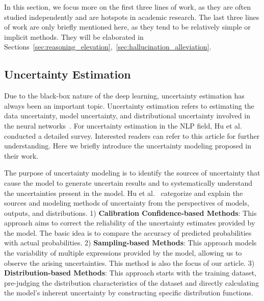 \documentclass[lettersize,journal]{IEEEtran}
\begin{document}
In this section, we focus more on the first three lines of work, as they are often studied independently and are hotspots in academic research. The last three lines of work are only briefly mentioned here, as they tend to be relatively simple or implicit methods. They will be elaborated in Sections~\ref{sec:reasoning_elevation},~\ref{sec:hallucination_alleviation}.


\subsection{Uncertainty Estimation} \label{sec:uncertainty}


\noindent Due to the black-box nature of the deep learning, uncertainty estimation has always been an important topic. Uncertainty estimation refers to estimating the data uncertainty, model uncertainty, and distributional uncertainty involved in the neural networks~\cite{deng2023uncertainty}. For uncertainty estimation in the NLP field, Hu et al.~\cite{SurveyUncertainty_23_arXiv_Nankai} conducted a detailed survey. Interested readers can refer to this article for further understanding. Here we briefly introduce the uncertainty modeling proposed in their work.

The purpose of uncertainty modeling is to identify the sources of uncertainty that cause the model to generate uncertain results and to systematically understand the uncertainties present in the model. Hu et al.~\cite{SurveyUncertainty_23_arXiv_Nankai} categorize and explain the sources and modeling methods of uncertainty from the perspectives of models, outputs, and distributions. 1) \textbf{Calibration Confidence-based Methods}: This approach aims to correct the reliability of the uncertainty estimates provided by the model. The basic idea is to compare the accuracy of predicted probabilities with actual probabilities. 2) \textbf{Sampling-based Methods}: This approach models the variability of multiple expressions provided by the model, allowing us to observe the arising uncertainties. This method is also the focus of our article. 3) \textbf{Distribution-based Methods}: This approach starts with the training dataset, pre-judging the distribution characteristics of the dataset and directly calculating the model's inherent uncertainty by constructing specific distribution functions.
\end{document}
